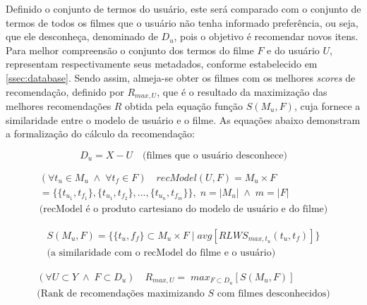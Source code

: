 Definido o conjunto de termos do usuário, este será comparado com o conjunto de termos de todos os filmes que o usuário não tenha informado preferência, ou seja, que ele desconheça, denominado de $D_u$, pois o objetivo é recomendar novos itens. Para melhor compreensão o conjunto dos termos do filme $F$ e do usuário $U$, representam respectivamente seus metadados, conforme estabelecido em \ref{ssec:database}. Sendo assim, almeja-se obter os filmes com os melhores \textit{scores} de recomendação, definido por $R_{max, U}$, que é o resultado da maximização das melhores recomendações $R$ obtida pela equação função $S(M_u, F)$, cuja fornece a similaridade entre o modelo de usuário e o filme. As equações abaixo demonstram a formalização do cálculo da recomendação:

\begin{equation}
	D_u = X - U \quad \text{(filmes que o usuário desconhece)}
\label{eq:rec_model_movies}
\end{equation}

\begin{equation}
	\begin{aligned}
		(\forall t_u \in M_u \;\land\; \forall t_f \in F) \quad recModel(U, F) = M_u \times F\\
		= \{\{t_{u_1}, t_{f_1}\}, \{t_{u_1}, t_{f_2}\}, ..., \{t_{u_n}, t_{f_m}\}\},\; n = |M_u| \;\land\; m = |F|\\
		\text{(recModel é o produto cartesiano do modelo de usuário e do filme)}
	\end{aligned}
\label{eq:rec_model_eq}
\end{equation}

\begin{equation}
	\begin{aligned}
		S(M_u, F) = \{\{t_u, f_f\} \subset M_u \times F \;|\; avg[RLWS_{max, t_u}(t_u, t_f)]\}\\
		\text{(a similaridade com o recModel do filme e o usuário)}
	\end{aligned}
\label{eq:rec_model_similarity}
\end{equation}

\begin{equation}
	\begin{aligned}
		(\forall U \subset Y\; \land \; F \subset D_u) \quad R_{max, U} = \; max_{F \subset D_u}[S(M_u, F)]\\
		\text{(Rank de recomendações maximizando $S$ com filmes desconhecidos)}
	\end{aligned}
\label{eq:rec_model_max}
\end{equation}

